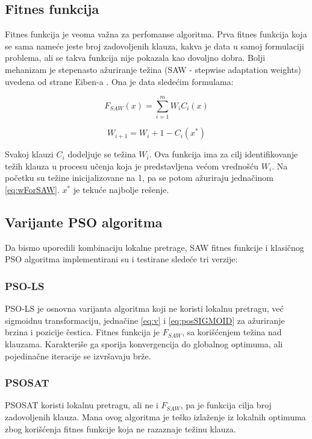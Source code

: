\documentclass[a4paper]{article}
\begin{document}
\subsection{Fitnes funkcija}
\label{sec:pso_fitness}
Fitnes funkcija je veoma važna za perfomanse algoritma.
Prva fitnes funkcija koja se sama nameće jeste broj zadovoljenih klauza, kakva je data u samoj formulaciji problema, ali se takva funkcija nije pokazala kao dovoljno dobra. Bolji mehanizam je stepenasto ažuriranje težina (SAW - stepwise adaptation weights) uvedena od strane Eiben-a \cite{fitnes}. Ona je data sledećim formulama:

\begin{equation}\label{eq:SAW}
F_{SAW}(x) = \sum_{i=1}^{m} W_iC_i(x)
\end{equation}

\begin{equation}\label{eq:wForSAW}
W_{i+1} = W_{i} + 1 - C_i(x^*)
\end{equation}

Svakoj klauzi $C_i$ dodeljuje se težina $W_i$. Ova funkcija ima za cilj identifikovanje težih klauza u procesu učenja koja je predstavljena većom vrednošću $W_i$. Na početku su težine inicijalizovane na 1, pa se potom ažuriraju jednačinom \ref{eq:wForSAW}. $x^*$ je tekuće najbolje rešenje.


\subsection{Varijante PSO algoritma}
\label{sec:pso_varijante}

Da bismo uporedili kombinaciju lokalne pretrage, SAW fitnes funkcije i klasičnog PSO algoritma implementirani su i testirane sledeće tri verzije: \\

\subsubsection{PSO-LS}
\label{sec:psols}
PSO-LS je osnovna varijanta algoritma koji ne koristi lokalnu pretragu, već sigmoidnu transformaciju, jednačine \ref{eq:v} i \ref{eq:posSIGMOID} za ažuriranje brzina i pozicije čestica. Fitnes funkcija je $F_{SAW}$, sa korišćenjem težina nad klauzama. Karakteriše ga sporija konvergencija do globalnog optimuma, ali pojedinačne iteracije se izvršavaju brže.

\subsubsection{PSOSAT}
\label{sec:psosat}
PSOSAT koristi lokalnu pretragu, ali ne i $F_{SAW}$, pa je funkcija cilja broj zadovoljenih klauza. Mana ovog algoritma je teško izlaženje iz lokalnih optimuma zbog korišćenja fitnes funkcije koja ne razaznaje težinu klauza.
\end{document}
